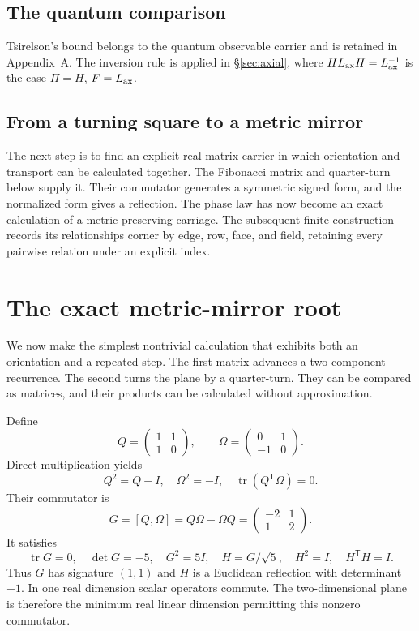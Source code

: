 \documentclass[10pt]{article}
\begin{document}
\subsection*{The quantum comparison}
Tsirelson's bound belongs to the quantum observable carrier and is retained
in Appendix~A. The inversion rule is applied in \S\ref{sec:axial}, where
$HL_{\rm ax}H=L_{\rm ax}^{-1}$ is the case $\Pi=H$, $F=L_{\rm ax}$.

\subsection*{From a turning square to a metric mirror}
The next step is to find an explicit real matrix carrier in which
orientation and transport can be calculated together. The
Fibonacci matrix and quarter-turn below supply it. Their
commutator generates a symmetric signed form, and the normalized
form gives a reflection. The phase law has now
become an exact calculation of a metric-preserving carriage.
The subsequent finite construction records its relationships
corner by edge, row, face, and field, retaining every pairwise
relation under an explicit index.

\section{The exact metric-mirror root}\label{sec:root}
We now make the simplest nontrivial calculation that exhibits both an orientation and a repeated step. The first matrix advances a two-component recurrence. The second turns the plane by a quarter-turn. They can be compared as matrices, and their products can be calculated without approximation.


Define
\begin{equation}Q=\begin{pmatrix}1&1\\1&0\end{pmatrix},\qquad \Omega=\begin{pmatrix}0&1\\-1&0\end{pmatrix}.\end{equation}
Direct multiplication yields
\begin{equation}Q^2=Q+I,\quad\Omega^2=-I,\quad\operatorname{tr}(Q^{\mathsf T}\Omega)=0.\end{equation}
Their commutator is
\begin{equation}\boxed{G=[Q,\Omega]=Q\Omega-\Omega Q=\begin{pmatrix}-2&1\\1&2\end{pmatrix}.}\end{equation}
It satisfies
\begin{equation}\operatorname{tr}G=0,\quad\det G=-5,\quad G^2=5I,\quad H=G/\sqrt5,\quad H^2=I,\quad H^{\mathsf T}H=I.\end{equation}
Thus $G$ has signature $(1,1)$ and $H$ is a Euclidean reflection with determinant $-1$. In one real dimension scalar operators commute. The two-dimensional plane is therefore the minimum real linear dimension permitting this nonzero commutator.
\end{document}
